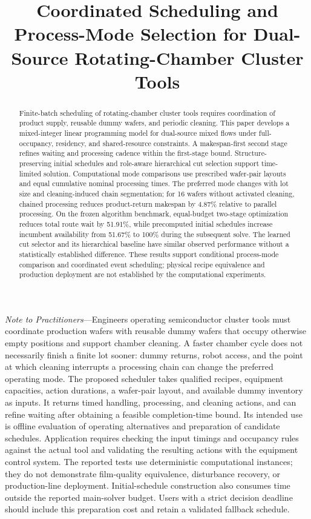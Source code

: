 \documentclass[journal]{IEEEtran}
\newcounter{algorithm}
\begin{document}
\raggedbottom
{}
\title{Coordinated Scheduling and Process-Mode Selection for Dual-Source Rotating-Chamber Cluster Tools}
\author{}
\maketitle
\begin{abstract}
Finite-batch scheduling of rotating-chamber cluster tools requires coordination of product supply, reusable dummy wafers, and periodic cleaning. This paper develops a mixed-integer linear programming model for dual-source mixed flows under full-occupancy, residency, and shared-resource constraints. A makespan-first second stage refines waiting and processing cadence within the first-stage bound. Structure-preserving initial schedules and role-aware hierarchical cut selection support time-limited solution. Computational mode comparisons use prescribed wafer-pair layouts and equal cumulative nominal processing times. The preferred mode changes with lot size and cleaning-induced chain segmentation; for 16 wafers without activated cleaning, chained processing reduces product-return makespan by 4.87\% relative to parallel processing. On the frozen algorithm benchmark, equal-budget two-stage optimization reduces total route wait by 51.91\%, while precomputed initial schedules increase incumbent availability from 51.67\% to 100\% during the subsequent solve. The learned cut selector and its hierarchical baseline have similar observed performance without a statistically established difference. These results support conditional process-mode comparison and coordinated event scheduling; physical recipe equivalence and production deployment are not established by the computational experiments.
\end{abstract}

{\small\noindent\textit{Note to Practitioners}---Engineers operating semiconductor cluster tools must coordinate production wafers with reusable dummy wafers that occupy otherwise empty positions and support chamber cleaning. A faster chamber cycle does not necessarily finish a finite lot sooner: dummy returns, robot access, and the point at which cleaning interrupts a processing chain can change the preferred operating mode. The proposed scheduler takes qualified recipes, equipment capacities, action durations, a wafer-pair layout, and available dummy inventory as inputs. It returns timed handling, processing, and cleaning actions, and can refine waiting after obtaining a feasible completion-time bound. Its intended use is offline evaluation of operating alternatives and preparation of candidate schedules. Application requires checking the input timings and occupancy rules against the actual tool and validating the resulting actions with the equipment control system. The reported tests use deterministic computational instances; they do not demonstrate film-quality equivalence, disturbance recovery, or production-line deployment. Initial-schedule construction also consumes time outside the reported main-solver budget. Users with a strict decision deadline should include this preparation cost and retain a validated fallback schedule.\par}
\end{document}
